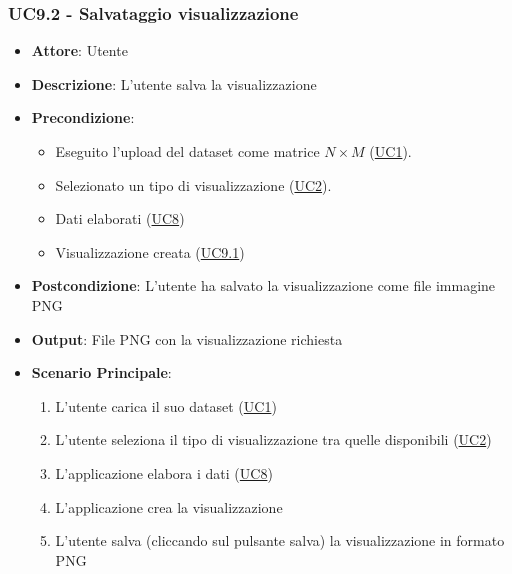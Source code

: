     \subsubsection{UC9.2 - Salvataggio visualizzazione}
    \label{uc9.2}
    \begin{itemize}
    \item \textbf{Attore}: Utente
    \item \textbf{Descrizione}:  L'utente salva la visualizzazione
    \item \textbf{Precondizione}: 
    \begin{itemize}
        \item Eseguito l'upload del dataset come matrice $N\times M$ (\hyperref[uc1]{UC1}).
        \item Selezionato un tipo di visualizzazione (\hyperref[uc2]{UC2}).
        \item Dati elaborati (\hyperref[uc8]{UC8})
        \item Visualizzazione creata (\hyperref[uc9.1]{UC9.1})
    \end{itemize}  
    \item \textbf{Postcondizione}: L'utente ha salvato la visualizzazione come file immagine PNG
    \item \textbf{Output}: File PNG con la visualizzazione richiesta
    \item \textbf{Scenario Principale}: 
    \begin{enumerate}
        \item L'utente carica il suo dataset (\hyperref[uc1]{UC1})
        \item L'utente seleziona il tipo di visualizzazione tra quelle disponibili (\hyperref[uc2]{UC2})
        \item L'applicazione elabora i dati (\hyperref[uc8]{UC8})
        \item L'applicazione crea la visualizzazione
        \item L'utente salva (cliccando sul pulsante salva) la visualizzazione in formato PNG
    \end{enumerate}
    \end{itemize}